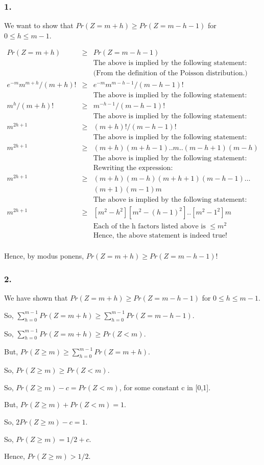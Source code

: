 \documentclass[10pt]{article}
\begin{document}
\subsubsection{1.}
We want to show that $Pr(Z=m+h)\geq Pr(Z=m-h-1)$ for $0\leq h\leq m-1$.

\begin{eqnarray*}
Pr(Z=m+h) &\geq& Pr(Z=m-h-1)\\
&&\text{The above is implied by the following statement:}\\
&&\text{(From the definition of the Poisson distribution.)}\\
e^{-m}m^{m+h}/(m+h)! &\geq& e^{-m}m^{m-h-1}/(m-h-1)! \\
&&\text{The above is implied by the following statement:}\\
m^{h}/(m+h)! &\geq& m^{-h-1}/(m-h-1)! \\
&&\text{The above is implied by the following statement:}\\
m^{2h+1} &\geq& (m+h)!/(m-h-1)! \\
&&\text{The above is implied by the following statement:}\\
m^{2h+1} &\geq& (m+h)(m+h-1)..m..(m-h+1)(m-h) \\
&&\text{The above is implied by the following statement:}\\
&&\text{Rewriting the expression:}\\
m^{2h+1} &\geq& (m+h)(m-h)(m+h+1)(m-h-1)\dots \\
&& (m+1)(m-1)m\\
&&\text{The above is implied by the following statement:}\\
m^{2h+1} &\geq& [m^{2}-h^{2}][m^{2}-(h-1)^{2}]..[m^{2}-1^{2}]m\\
&&\text{Each of the h factors listed above is $\leq m^{2}$}\\
&&\text{Hence, the above statement is indeed true!}\\
\end{eqnarray*}

Hence, by modus ponens, $Pr(Z=m+h) \geq Pr(Z=m-h-1)$!

\subsubsection{2.}
We have shown that $Pr(Z=m+h)\geq Pr(Z=m-h-1)$ for $0\leq h\leq m-1$.

So, $\sum_{h=0}^{m-1}Pr(Z=m+h)\geq \sum_{h=0}^{m-1}Pr(Z=m-h-1)$.

So, $\sum_{h=0}^{m-1}Pr(Z=m+h)\geq Pr(Z<m)$.

But, $Pr(Z \geq m) \geq \sum_{h=0}^{m-1}Pr(Z=m+h)$.

So, $Pr(Z \geq m) \geq Pr(Z < m)$.

So, $Pr(Z \geq m) - c= Pr(Z < m)$, for some constant c in [0,1].

But, $Pr(Z \geq m) + Pr(Z < m) = 1$.

So, $2Pr(Z \geq m) - c = 1$.

So, $Pr(Z \geq m) = 1/2 + c$.

Hence, $Pr(Z \geq m) > 1/2$.




\end{document}
